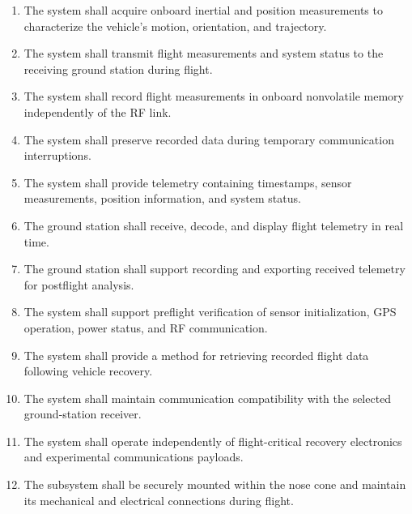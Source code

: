 \begin{enumerate}

    \item The system shall acquire onboard inertial
    and position measurements to characterize
    the vehicle's motion, orientation, and trajectory.

    \item The system shall transmit flight
    measurements and system status to the
    receiving ground station during flight.

    \item The system shall record flight
    measurements in onboard nonvolatile
    memory independently of the RF link.

    \item The system shall preserve recorded
    data during temporary communication
    interruptions.

    \item The system shall provide telemetry
    containing timestamps, sensor measurements,
    position information, and system status.

    \item The ground station shall receive,
    decode, and display flight telemetry
    in real time.

    \item The ground station shall support
    recording and exporting received
    telemetry for postflight analysis.

    \item The system shall support preflight
    verification of sensor initialization,
    GPS operation, power status,
    and RF communication.

    \item The system shall provide a method
    for retrieving recorded flight data
    following vehicle recovery.

    \item The system shall maintain
    communication compatibility with
    the selected ground-station receiver.

    \item The system shall operate
    independently of flight-critical
    recovery electronics and experimental
    communications payloads.

    \item The subsystem shall be securely
    mounted within the nose cone and
    maintain its mechanical and electrical
    connections during flight.

\end{enumerate}
